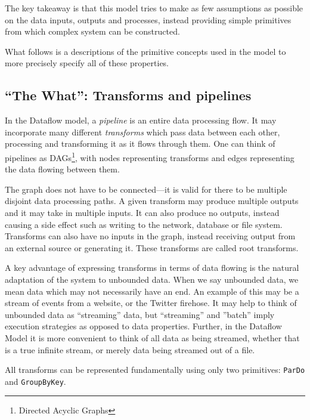 The key takeaway is that this model tries to make as few assumptions as possible on the data inputs, outputs and processes, instead providing simple primitives from which complex system can be constructed.

What follows is a descriptions of the primitive concepts used in the model to more precisely specify all of these properties.

\subsection{``The What'': Transforms and pipelines}

In the Dataflow model, a \emph{pipeline} is an entire data processing flow.
It may incorporate many different \emph{transforms} which pass data between each other, processing and transforming it as it flows through them.
One can think of pipelines as DAGs\footnote{Directed Acyclic Graphs}, with nodes representing transforms and edges representing the data flowing between them.


The graph does not have to be connected---it is valid for there to be multiple disjoint data processing paths.
A given transform may produce multiple outputs and it may take in multiple inputs.
It can also produce no outputs, instead causing a side effect such as writing to the network, database or file system.
Transforms can also have no inputs in the graph, instead receiving output from an external source or generating it.
These transforms are called root transforms.

A key advantage of expressing transforms in terms of data flowing is the natural adaptation of the system to unbounded data.
When we say unbounded data, we mean data which may not necessarily have an end.
An example of this may be a stream of events from a website, or the Twitter firehose.
It may help to think of unbounded data as ``streaming'' data, but ``streaming'' and ''batch'' imply execution strategies as opposed to data properties.
Further, in the Dataflow Model it is more convenient to think of all data as being streamed, whether that is a true infinite stream, or merely data being streamed out of a file.

All transforms can be represented fundamentally using only two primitives: \verb|ParDo| and \verb|GroupByKey|\footnotemark[2].


